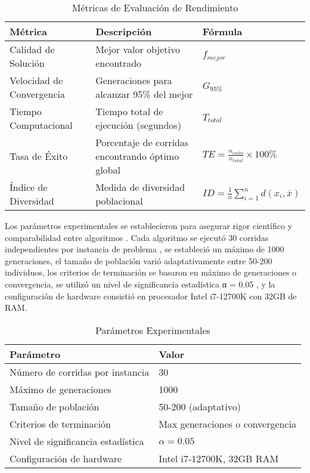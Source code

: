 \documentclass[12pt,a4paper]{article}
\begin{document}
\begin{table}[H]
\centering
\caption{Métricas de Evaluación de Rendimiento}
\begin{tabular}{@{}lll@{}}
\toprule
\textbf{Métrica} & \textbf{Descripción} & \textbf{Fórmula} \\
\midrule
Calidad de Solución & Mejor valor objetivo encontrado & $f_{mejor}$ \\
Velocidad de Convergencia & Generaciones para alcanzar 95\% del mejor & $G_{95\%}$ \\
Tiempo Computacional & Tiempo total de ejecución (segundos) & $T_{total}$ \\
Tasa de Éxito & Porcentaje de corridas encontrando óptimo global & $TE = \frac{n_{exito}}{n_{total}} \times 100\%$ \\
Índice de Diversidad & Medida de diversidad poblacional & $ID = \frac{1}{n}\sum_{i=1}^{n}d(x_i, \bar{x})$ \\
\bottomrule
\end{tabular}
\label{tab:metrics}
\end{table}

Los parámetros experimentales se establecieron para asegurar rigor científico y comparabilidad entre algoritmos \cite{eiben2007parameter}. Cada algoritmo se ejecutó 30 corridas independientes por instancia de problema \cite{birattari2006racing}, se estableció un máximo de 1000 generaciones, el tamaño de población varió adaptativamente entre 50-200 individuos, los criterios de terminación se basaron en máximo de generaciones o convergencia, se utilizó un nivel de significancia estadística α = 0.05 \cite{derrac2011practical}, y la configuración de hardware consistió en procesador Intel i7-12700K con 32GB de RAM.

\begin{table}[H]
\centering
\caption{Parámetros Experimentales}
\begin{tabular}{@{}ll@{}}
\toprule
\textbf{Parámetro} & \textbf{Valor} \\
\midrule
Número de corridas por instancia & 30 \\
Máximo de generaciones & 1000 \\
Tamaño de población & 50-200 (adaptativo) \\
Criterios de terminación & Max generaciones o convergencia \\
Nivel de significancia estadística & $\alpha = 0.05$ \\
Configuración de hardware & Intel i7-12700K, 32GB RAM \\
\bottomrule
\end{tabular}
\label{tab:parameters}
\end{table}
\end{document}
